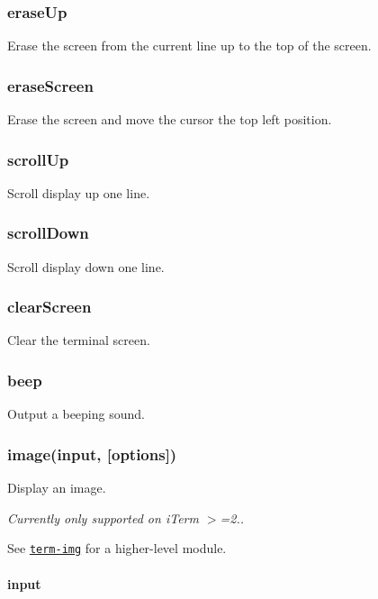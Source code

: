 \subsubsection*{erase\+Up}

Erase the screen from the current line up to the top of the screen.

\subsubsection*{erase\+Screen}

Erase the screen and move the cursor the top left position.

\subsubsection*{scroll\+Up}

Scroll display up one line.

\subsubsection*{scroll\+Down}

Scroll display down one line.

\subsubsection*{clear\+Screen}

Clear the terminal screen.

\subsubsection*{beep}

Output a beeping sound.

\subsubsection*{image(input, \mbox{[}options\mbox{]})}

Display an image.

{\itshape Currently only supported on i\+Term $>$=2..}

See \href{https://github.com/sindresorhus/term-img}{\tt term-\/img} for a higher-\/level module.

\paragraph*{input}

